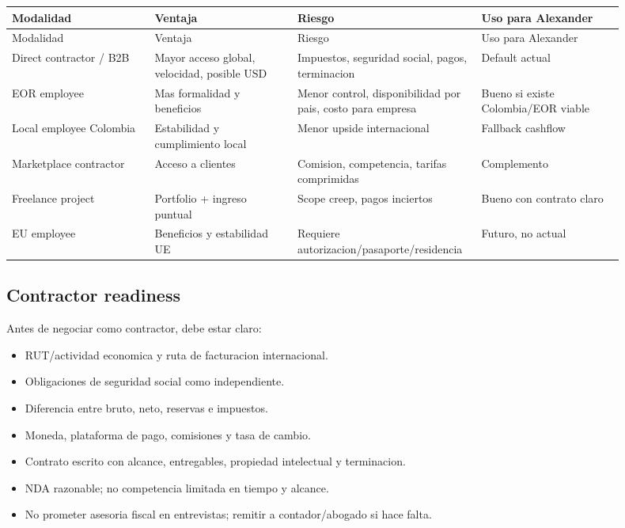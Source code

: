 \begin{center}
\scriptsize
\begin{longtable}{>{\raggedright\arraybackslash}p{0.225\linewidth} >{\raggedright\arraybackslash}p{0.225\linewidth} >{\raggedright\arraybackslash}p{0.225\linewidth} >{\raggedright\arraybackslash}p{0.225\linewidth}}
\toprule
Modalidad & Ventaja & Riesgo & Uso para Alexander \\
\midrule
\endfirsthead
\toprule
Modalidad & Ventaja & Riesgo & Uso para Alexander \\
\midrule
\endhead
Direct contractor / B2B & Mayor acceso global, velocidad, posible USD & Impuestos, seguridad social, pagos, terminacion & Default actual \\
EOR employee & Mas formalidad y beneficios & Menor control, disponibilidad por pais, costo para empresa & Bueno si existe Colombia/EOR viable \\
Local employee Colombia & Estabilidad y cumplimiento local & Menor upside internacional & Fallback cashflow \\
Marketplace contractor & Acceso a clientes & Comision, competencia, tarifas comprimidas & Complemento \\
Freelance project & Portfolio + ingreso puntual & Scope creep, pagos inciertos & Bueno con contrato claro \\
EU employee & Beneficios y estabilidad UE & Requiere autorizacion/pasaporte/residencia & Futuro, no actual \\
\bottomrule
\end{longtable}
\end{center}


\subsection{Contractor readiness}


Antes de negociar como contractor, debe estar claro:


\begin{itemize}
\item RUT/actividad economica y ruta de facturacion internacional.
\item Obligaciones de seguridad social como independiente.
\item Diferencia entre bruto, neto, reservas e impuestos.
\item Moneda, plataforma de pago, comisiones y tasa de cambio.
\item Contrato escrito con alcance, entregables, propiedad intelectual y terminacion.
\item NDA razonable; no competencia limitada en tiempo y alcance.
\item No prometer asesoria fiscal en entrevistas; remitir a contador/abogado si hace falta.
\end{itemize}


